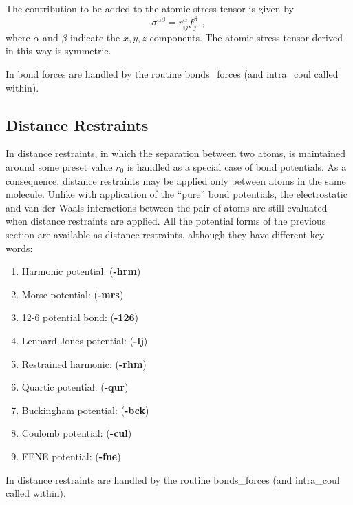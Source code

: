 The contribution to be added to the atomic stress
tensor is given by
\begin{equation}
\sigma^{\alpha \beta} = r_{ij}^{\alpha} f_{j}^{\beta}~~,
\end{equation}
where $\alpha$ and $\beta$ indicate the $x,y,z$ components.  The
atomic stress tensor derived in this way is
symmetric.

In \D bond forces are handled by the routine {\sc bonds\_forces}
(and {\sc intra\_coul} called within).

\subsection{Distance Restraints}

In \D distance restraints, in which the separation between two
atoms, is maintained around some preset value $r_0$ is handled as
a special case of bond potentials.  As a consequence, distance
restraints may be applied only between atoms in the same molecule.
Unlike with application of the ``pure'' bond
potentials, the
electrostatic and van der
Waals interactions between the pair
of atoms are still evaluated when distance restraints are applied.
All the potential forms of the previous section are available as
distance restraints, although they have
different key words:

\begin{enumerate}
\item Harmonic potential:  ({\bf -hrm})
\item Morse potential:  ({\bf -mrs})
\item 12-6 potential bond:  ({\bf -126})
\item Lennard-Jones potential:  ({\bf -lj})
\item Restrained harmonic:  ({\bf -rhm})
\item Quartic potential:  ({\bf -qur})
\item Buckingham potential:  ({\bf -bck})
\item Coulomb potential:  ({\bf -cul})
\item FENE potential:  ({\bf -fne})
\end{enumerate}

In \D distance restraints are handled
by the routine {\sc bonds\_forces} (and {\sc intra\_coul} called within).

